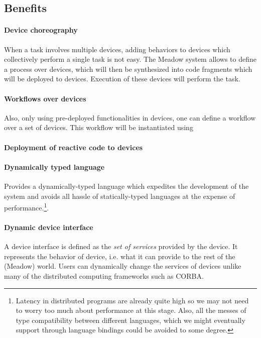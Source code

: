 \documentclass{note}
\begin{document}
\subsection{Benefits}
\paragraph{Device choreography}
When a task involves multiple devices, adding behaviors to devices
  which collectively perform a single task is not easy. The Meadow system
  allows to define a process over devices, which will then be synthesized into
  code fragments which will be deployed to devices. Execution of these devices
  will perform the task.

\paragraph{Workflows over devices}
Also, only using pre-deployed functionalities in devices, one can define a
workflow over a set of devices. This workflow will be instantiated using 

\paragraph{Deployment of reactive code to devices}


\paragraph{Dynamically typed language}
Provides a dynamically-typed language which expedites the development of
   the system and avoids all hassle of statically-typed languages at the 
   expense of performance.\footnote{Latency in distributed programs are
     already quite high so we may not need to worry too much about performance
    at this stage. Also, all the messes of type compatibility between
    different languages, which we might eventually support through language
    bindings could be avoided to some degree.}.

\paragraph{Dynamic device interface}
A device interface is defined as the {\em set of services\/}
provided by the device.
It represents the behavior of device, i.e. what it can provide to the rest of
the (Meadow) world. Users can dynamically change the services of devices
unlike many of the distributed computing frameworks such as CORBA. 
\end{document}
